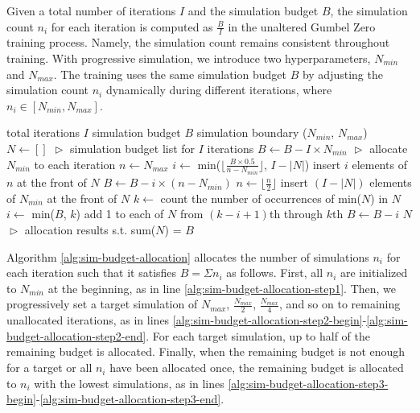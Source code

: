 Given a total number of iterations $I$ and the simulation budget $B$, the simulation count $n_i$ for each iteration is computed as $\frac{B}{I}$ in the unaltered Gumbel Zero training process.
Namely, the simulation count remains consistent throughout training.
With progressive simulation, we introduce two hyperparameters, $N_{min}$ and $N_{max}$.
The training uses the same simulation budget $B$ by adjusting the simulation count $n_i$ dynamically during different iterations, where $n_i\in[N_{min}, N_{max}]$.

\begin{algorithm}[t]
\caption{Progressive Simulation Budget Allocation}\label{alg:sim-budget-allocation}
\begin{algorithmic}[1]
\REQUIRE total iterations $I$
\REQUIRE simulation budget $B$
\REQUIRE simulation boundary ($N_{min}$, $N_{max}$)
\STATE $N \gets []$  \hfill$\vartriangleright$ simulation budget list for $I$ iterations
\STATE \label{alg:sim-budget-allocation-step1} $B \gets B - I \times N_{min}$  \hfill$\vartriangleright$ allocate $N_{min}$ to each iteration
\STATE \label{alg:sim-budget-allocation-step2-begin} $n \gets N_{max}$
  \STATE $i \gets $ min($\lfloor \frac{B \times 0.5}{n - N_{min}} \rfloor$, $I - |N|$)
  \STATE insert $i$ elements of $n$ at the front of $N$
  \STATE $B \gets B - i \times (n - N_{min})$
  \STATE $n \gets \lfloor \frac{n}{2} \rfloor$
\ENDWHILE
\STATE \label{alg:sim-budget-allocation-step2-end} insert $(I-|N|)$ elements of $N_{min}$ at the front of $N$
 \label{alg:sim-budget-allocation-step3-begin}
  \STATE $k \gets$ count the number of occurrences of min($N$) in $N$
  \STATE $i \gets$ min($B$, $k$) 
  \STATE add 1 to each of $N$ from $(k-i+1)$th through $k$th
  \STATE $B\gets B - i$
\ENDWHILE \label{alg:sim-budget-allocation-step3-end}
\RETURN $N$  \hfill$\vartriangleright$ allocation results s.t. sum($N$) = $B$
\end{algorithmic}
\end{algorithm}

Algorithm \ref{alg:sim-budget-allocation} allocates the number of simulations $n_i$ for each iteration such that it satisfies $B = \Sigma n_i$ as follows. 
First, all $n_i$ are initialized to $N_{min}$ at the beginning, as in line \ref{alg:sim-budget-allocation-step1}.
Then, we progressively set a target simulation of $N_{max}$, $\frac{N_{max}}{2}$, $\frac{N_{max}}{4}$, and so on to remaining unallocated iterations, as in lines \ref{alg:sim-budget-allocation-step2-begin}-\ref{alg:sim-budget-allocation-step2-end}.
For each target simulation, up to half of the remaining budget is allocated.
Finally, when the remaining budget is not enough for a target or all $n_i$ have been allocated once, the remaining budget is allocated to $n_i$ with the lowest simulations, as in lines \ref{alg:sim-budget-allocation-step3-begin}-\ref{alg:sim-budget-allocation-step3-end}.

